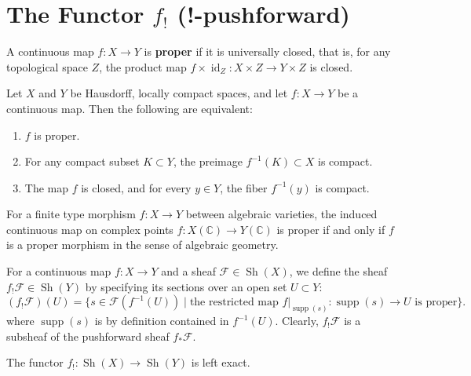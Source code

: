 \section{The Functor $f_!$ (!-pushforward)}

\begin{definition}
A continuous map $f \colon X \to Y$ is \textbf{proper} if it is universally closed, that is, for any topological space $Z$, the product map $f \times \operatorname{id}_Z \colon X \times Z \to Y \times Z$ is closed.
\end{definition}

\begin{proposition}
Let $X$ and $Y$ be Hausdorff, locally compact spaces, and let $f \colon X \to Y$ be a continuous map. Then the following are equivalent:
\begin{enumerate}
    \item $f$ is proper.
    \item For any compact subset $K \subset Y$, the preimage $f^{-1}(K) \subset X$ is compact.
    \item The map $f$ is closed, and for every $y \in Y$, the fiber $f^{-1}(y)$ is compact.
\end{enumerate}
\end{proposition}

\begin{remark}
For a finite type morphism $f \colon X \to Y$ between algebraic varieties, the induced continuous map on complex points $f \colon X(\mathbb{C}) \to Y(\mathbb{C})$ is proper if and only if $f$ is a proper morphism in the sense of algebraic geometry.
\end{remark}

\begin{definition}
For a continuous map $f \colon X \to Y$ and a sheaf $\mathcal{F} \in \operatorname{Sh}(X)$, we define the sheaf $f_!\mathcal{F} \in \operatorname{Sh}(Y)$ by specifying its sections over an open set $U \subset Y$:
\begin{equation*}
    (f_!\mathcal{F})(U) = \{ s \in \mathcal{F}(f^{-1}(U)) \mid \text{the restricted map } f|_{\operatorname{supp}(s)} \colon \operatorname{supp}(s) \to U \text{ is proper} \}.
\end{equation*}
where $\operatorname{supp}(s)$ is by definition contained in $f^{-1}(U)$.
Clearly, $f_!\mathcal{F}$ is a subsheaf of the pushforward sheaf $f_*\mathcal{F}$.
\end{definition}

\begin{lemma}
The functor $f_! \colon \operatorname{Sh}(X) \to \operatorname{Sh}(Y)$ is left exact.
\end{lemma}

